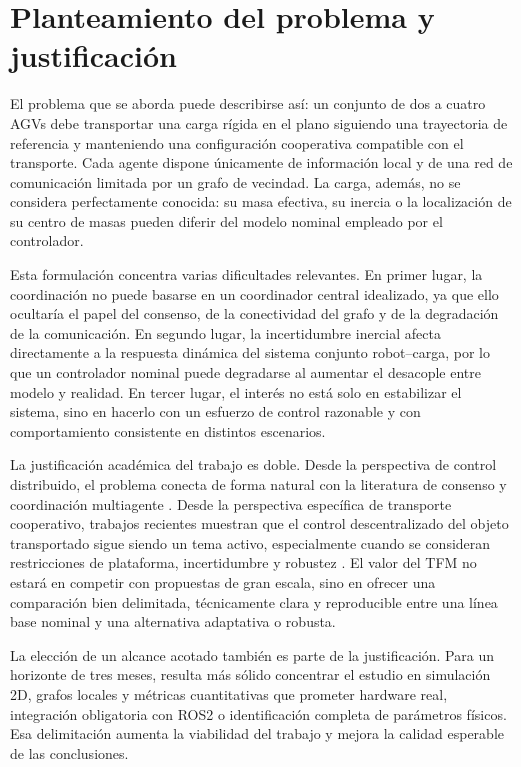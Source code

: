 \section{Planteamiento del problema y justificación}

El problema que se aborda puede describirse así: un conjunto de dos a cuatro AGVs debe transportar una carga rígida en el plano siguiendo una trayectoria de referencia y manteniendo una configuración cooperativa compatible con el transporte. Cada agente dispone únicamente de información local y de una red de comunicación limitada por un grafo de vecindad. La carga, además, no se considera perfectamente conocida: su masa efectiva, su inercia o la localización de su centro de masas pueden diferir del modelo nominal empleado por el controlador.

Esta formulación concentra varias dificultades relevantes. En primer lugar, la coordinación no puede basarse en un coordinador central idealizado, ya que ello ocultaría el papel del consenso, de la conectividad del grafo y de la degradación de la comunicación. En segundo lugar, la incertidumbre inercial afecta directamente a la respuesta dinámica del sistema conjunto robot--carga, por lo que un controlador nominal puede degradarse al aumentar el desacople entre modelo y realidad. En tercer lugar, el interés no está solo en estabilizar el sistema, sino en hacerlo con un esfuerzo de control razonable y con comportamiento consistente en distintos escenarios.

La justificación académica del trabajo es doble. Desde la perspectiva de control distribuido, el problema conecta de forma natural con la literatura de consenso y coordinación multiagente \citep{bullo2009distributed,olfati2004consensus,ren2008distributed}. Desde la perspectiva específica de transporte cooperativo, trabajos recientes muestran que el control descentralizado del objeto transportado sigue siendo un tema activo, especialmente cuando se consideran restricciones de plataforma, incertidumbre y robustez \citep{an2023cooperative,verginis2018communication,ebel2024cooperative,rosenfelder2024force}. El valor del TFM no estará en competir con propuestas de gran escala, sino en ofrecer una comparación bien delimitada, técnicamente clara y reproducible entre una línea base nominal y una alternativa adaptativa o robusta.

La elección de un alcance acotado también es parte de la justificación. Para un horizonte de tres meses, resulta más sólido concentrar el estudio en simulación 2D, grafos locales y métricas cuantitativas que prometer hardware real, integración obligatoria con ROS2 o identificación completa de parámetros físicos. Esa delimitación aumenta la viabilidad del trabajo y mejora la calidad esperable de las conclusiones.
